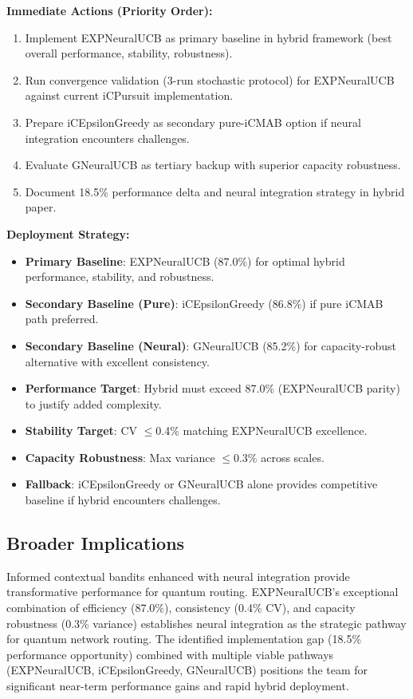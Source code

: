 \documentclass[12pt,a4paper]{article}
\begin{document}
\textbf{Immediate Actions (Priority Order):}
\begin{enumerate}
\item Implement EXPNeuralUCB as primary baseline in hybrid framework (best overall performance, stability, robustness).
\item Run convergence validation (3-run stochastic protocol) for EXPNeuralUCB against current iCPursuit implementation.
\item Prepare iCEpsilonGreedy as secondary pure-iCMAB option if neural integration encounters challenges.
\item Evaluate GNeuralUCB as tertiary backup with superior capacity robustness.
\item Document 18.5\% performance delta and neural integration strategy in hybrid paper.
\end{enumerate}

\textbf{Deployment Strategy:}
\begin{itemize}
\item \textbf{Primary Baseline}: EXPNeuralUCB (87.0\%) for optimal hybrid performance, stability, and robustness.
\item \textbf{Secondary Baseline (Pure)}: iCEpsilonGreedy (86.8\%) if pure iCMAB path preferred.
\item \textbf{Secondary Baseline (Neural)}: GNeuralUCB (85.2\%) for capacity-robust alternative with excellent consistency.
\item \textbf{Performance Target}: Hybrid must exceed 87.0\% (EXPNeuralUCB parity) to justify added complexity.
\item \textbf{Stability Target}: CV $\leq$0.4\% matching EXPNeuralUCB excellence.
\item \textbf{Capacity Robustness}: Max variance $\leq$0.3\% across scales.
\item \textbf{Fallback}: iCEpsilonGreedy or GNeuralUCB alone provides competitive baseline if hybrid encounters challenges.
\end{itemize}

\subsection{Broader Implications}

Informed contextual bandits enhanced with neural integration provide transformative performance for quantum routing. EXPNeuralUCB's exceptional combination of efficiency (87.0\%), consistency (0.4\% CV), and capacity robustness (0.3\% variance) establishes neural integration as the strategic pathway for quantum network routing. The identified implementation gap (18.5\% performance opportunity) combined with multiple viable pathways (EXPNeuralUCB, iCEpsilonGreedy, GNeuralUCB) positions the team for significant near-term performance gains and rapid hybrid deployment.
\end{document}

